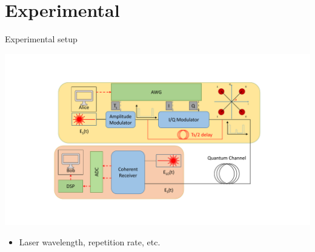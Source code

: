 \documentclass{beamer}
\begin{document}
\section{Experimental}
\begin{frame}[t]{Experimental setup}
\begin{center}
\includegraphics[width=\linewidth, trim={0cm 2.5cm 0cm 3cm}, clip=true]{withtrace.pdf}
\end{center}
\begin{itemize}
\item Laser wavelength, repetition rate, etc.
\end{itemize}
\end{frame}
\end{document}
